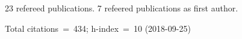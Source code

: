 23 refereed publications. 7 refeered publications as first author.

               Total citations~=~434; h-index~=~10 (2018-09-25)